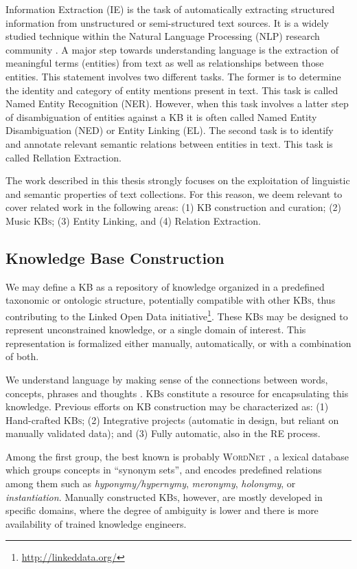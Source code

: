Information Extraction (IE) is the task of automatically extracting structured information from unstructured or semi-structured text sources. It is a widely studied technique within the Natural Language Processing (NLP) research community \cite{cowie1996information}.
A major step towards understanding language is the extraction of meaningful terms (entities) from text as well as relationships between those entities. This statement involves two different tasks. The former is to determine the identity and category of entity mentions present in text. This task is called Named Entity Recognition (NER). However, when this task involves a latter step of disambiguation of entities against a KB it is often called Named Entity Disambiguation (NED) or Entity Linking (EL). The second task is to identify and annotate relevant semantic relations between entities in text. This task is called Rellation Extraction.

The work described in this thesis strongly focuses on the exploitation of linguistic and semantic properties of text collections. For this reason, we deem relevant to cover related work in the following areas: (1) \textsc{KB} construction and curation; (2) Music \textsc{KBs}; (3) Entity Linking, and (4) Relation Extraction.


\subsection{Knowledge Base Construction}
\label{sec:SOA:nlu:kbs}

We may define a \textsc{KB} as a repository of knowledge organized in a predefined taxonomic or ontologic structure, potentially compatible with other \textsc{KBs}, thus contributing to the Linked Open Data initiative\footnote{\url{http://linkeddata.org/}}. These \textsc{KBs} may be designed to represent unconstrained knowledge, or a single domain of interest. This representation is formalized either manually, automatically, or with a combination of both.

We understand language by making sense of the connections between words, concepts, phrases and thoughts \citep{Havasietal2007}. \textsc{KBs} constitute a resource for encapsulating this knowledge. Previous efforts on \textsc{KB} construction may be characterized as: (1) Hand-crafted \textsc{KBs}; (2) Integrative projects (automatic in design, but reliant on manually validated data); and (3) Fully automatic, also in the \textsc{RE} process.

Among the first group, the best known is probably \textsc{WordNet} \citep{Miller1995}, a lexical database which groups concepts in ``synonym sets'', and encodes predefined relations among them such as \textit{hyponymy/hypernymy}, \textit{meronymy}, \textit{holonymy}, or \textit{instantiation}. Manually constructed \textsc{KBs}, however, are mostly developed in specific domains, where the degree of ambiguity is lower and there is more availability of trained knowledge engineers.


